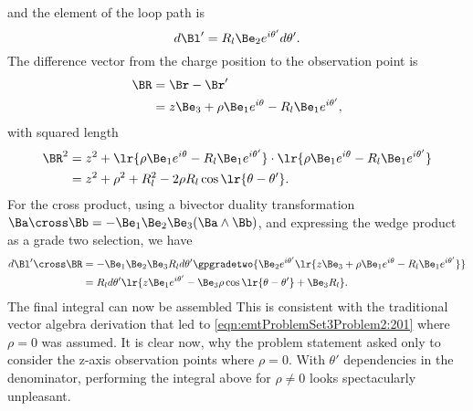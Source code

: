 %
and the element of the loop path is
\begin{equation}\label{eqn:emtProblemSet3Problem2:100}
d\Bl' = R_l \Be_2 e^{i\theta'} d\theta'.
\end{equation}
%
The difference vector from the charge position to the observation point is
%
\begin{equation}\label{eqn:emtProblemSet3Problem2:120}
\begin{aligned}
\BR
&= \Br - \Br'
\\ &=
z \Be_3 + \rho \Be_1 e^{i\theta}
-
R_l \Be_1 e^{i \theta'},
\end{aligned}
\end{equation}
%
with squared length
%
\begin{equation}\label{eqn:emtProblemSet3Problem2:140}
\begin{aligned}
\BR^2
&=
z^2 +
\lr{ \rho \Be_1 e^{i\theta}
-
R_l \Be_1 e^{i \theta'}
}
\cdot
\lr{ \rho \Be_1 e^{i\theta}
-
R_l \Be_1 e^{i \theta'}
}
\\ &=
z^2 + \rho^2 + R_l^2 - 2 \rho R_l \cos\lr{ \theta - \theta' }.
\end{aligned}
\end{equation}
%
For the cross product, using a bivector duality transformation \( \Ba \cross \Bb = -\Be_1 \Be_2 \Be_3 (\Ba \wedge \Bb) \), and expressing the wedge product as a grade two selection, we have
%
\begin{equation}\label{eqn:emtProblemSet3Problem2:180}
\begin{aligned}
d\Bl' \cross \BR
&=
-\Be_1 \Be_2 \Be_3 R_l d\theta' \gpgradetwo{
\Be_2 e^{i \theta'}
\lr{
z \Be_3 + \rho \Be_1 e^{i\theta}
-
R_l \Be_1 e^{i \theta'}
}
}
\\ &=
R_l d\theta' \lr{
z \Be_1 e^{i\theta'}
-
\Be_3 \rho \cos\lr{ \theta - \theta' }
+ \Be_3 R_l
}.
\end{aligned}
\end{equation}
%
The final integral can now be assembled
%
%
This is consistent with the traditional vector algebra derivation that led to \cref{eqn:emtProblemSet3Problem2:201} where \( \rho = 0 \) was assumed.
It is clear now, why the problem statement asked only to consider the z-axis observation points where \( \rho = 0 \).  With \( \theta' \) dependencies in the denominator, performing the integral above for \( \rho \ne 0 \) looks spectacularly unpleasant.
%
